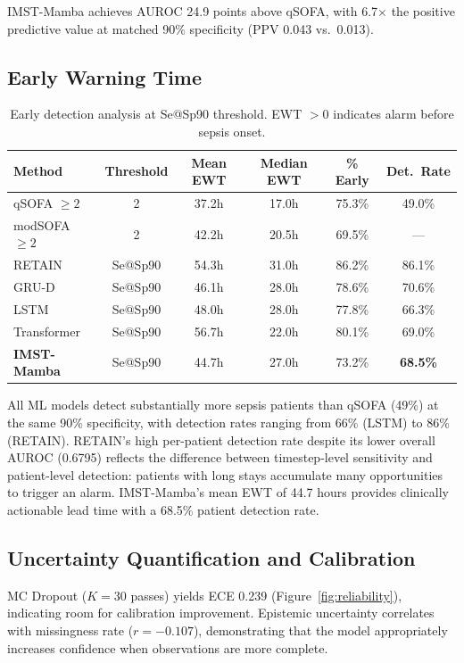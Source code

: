 \documentclass[11pt,a4paper]{article}
\begin{document}
IMST-Mamba achieves AUROC 24.9 points above qSOFA, with 6.7$\times$ the
positive predictive value at matched 90\% specificity (PPV 0.043 vs.\ 0.013).

\subsection{Early Warning Time}

\begin{table}[h]
\centering
\caption{Early detection analysis at Se@Sp90 threshold.
EWT $>0$ indicates alarm before sepsis onset.}
\label{tab:ewt}
\begin{tabular}{lccccc}
\toprule
Method & Threshold & Mean EWT & Median EWT & \% Early & Det.\ Rate \\
\midrule
qSOFA $\geq 2$   & 2     & 37.2h & 17.0h & 75.3\% & 49.0\% \\
modSOFA $\geq 2$ & 2     & 42.2h & 20.5h & 69.5\% & — \\
RETAIN           & Se@Sp90 & 54.3h & 31.0h & 86.2\% & 86.1\% \\
GRU-D            & Se@Sp90 & 46.1h & 28.0h & 78.6\% & 70.6\% \\
LSTM             & Se@Sp90 & 48.0h & 28.0h & 77.8\% & 66.3\% \\
Transformer      & Se@Sp90 & 56.7h & 22.0h & 80.1\% & 69.0\% \\
\midrule
\textbf{IMST-Mamba} & Se@Sp90 & 44.7h & 27.0h & 73.2\% & \textbf{68.5\%} \\
\bottomrule
\end{tabular}
\end{table}

All ML models detect substantially more sepsis patients than qSOFA (49\%)
at the same 90\% specificity, with detection rates ranging from 66\% (LSTM)
to 86\% (RETAIN).  RETAIN's high per-patient detection rate despite its lower
overall AUROC (0.6795) reflects the difference between timestep-level
sensitivity and patient-level detection: patients with long stays accumulate
many opportunities to trigger an alarm.  IMST-Mamba's mean EWT of 44.7 hours
provides clinically actionable lead time with a 68.5\% patient detection rate.

\subsection{Uncertainty Quantification and Calibration}

MC Dropout ($K=30$ passes) yields ECE 0.239 (Figure~\ref{fig:reliability}),
indicating room for calibration improvement.  Epistemic uncertainty correlates
with missingness rate ($r=-0.107$), demonstrating that the model appropriately
increases confidence when observations are more complete.
\end{document}
